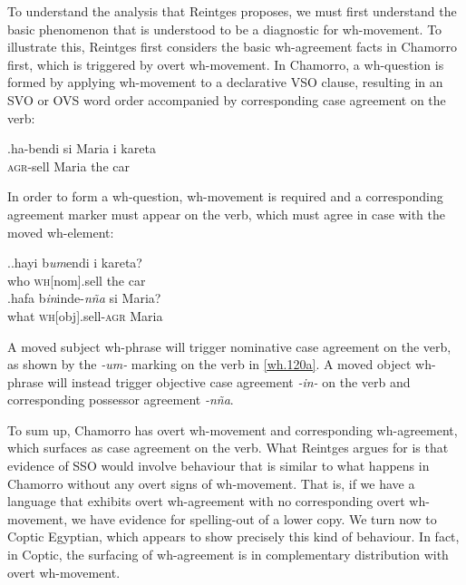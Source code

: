 \documentclass[charis]{glossa}
\begin{document}
To understand the analysis that Reintges proposes, we must first understand the basic phenomenon that is understood to be a diagnostic for wh-movement. To illustrate this, Reintges first considers the basic wh-agreement facts in Chamorro first, which is triggered by overt wh-movement. In Chamorro, a wh-question is formed by applying wh-movement to a declarative VSO clause, resulting in an SVO or OVS word order accompanied by corresponding case agreement on the verb:

\exg.\label{wh.110}ha-bendi si Maria i kareta\\
   \textsc{agr}-sell {} Maria the car\\

In order to form a wh-question, wh-movement is required and a corresponding agreement marker must appear on the verb, which must agree in case with the moved wh-element:

\ex.\ag.\label{wh.120a}hayi b\textit{um}endi i kareta?\\
   who \textsc{wh}[nom].sell the car\\
   \bg.\label{wh.120b}hafa b\textit{in}inde-\textit{n\~na} si Maria?\\
   what \textsc{wh}[obj].sell-\textsc{agr} {} Maria\\

A moved subject wh-phrase will trigger nominative case agreement on the verb, as shown by the \textit{-um-} marking on the verb in \ref{wh.120a}. A moved object wh-phrase will instead trigger objective case agreement \textit{-in-} on the verb and corresponding possessor agreement \textit{-n\~na}.

%

To sum up, Chamorro has overt wh-movement and corresponding wh-agreement, which surfaces as case agreement on the verb. What Reintges argues for is that evidence of SSO would involve behaviour that is similar to what happens in Chamorro without any overt signs of wh-movement. That is, if we have a language that exhibits overt wh-agreement with no corresponding overt wh-movement, we have evidence for spelling-out of a lower copy. We turn now to Coptic Egyptian, which appears to show precisely this kind of behaviour. In fact, in Coptic, the surfacing of wh-agreement is in complementary distribution with overt wh-movement.
\end{document}
